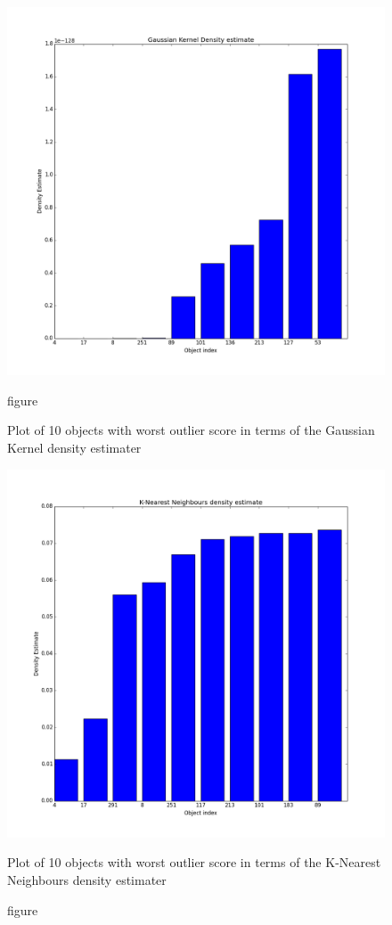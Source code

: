 \documentclass[a4paper,10pt]{article}
\begin{document}
\begin{figure}[H]
\centering
\begin{minipage}{.45\textwidth}
  \centering
  \includegraphics[width=1\linewidth]{fig_anomaly_kde_gauss}
  \caption{figure}{Plot of 10 objects with worst outlier score in terms of the Gaussian Kernel density estimater}
  \label{fig_anom_gauss}
\end{minipage}\hfill
\begin{minipage}{.45\textwidth}
  \centering
  \includegraphics[width=1\linewidth]{fig_anomaly_knn_de}
  \caption{figure}{Plot of 10 objects with worst outlier score in terms of the K-Nearest Neighbours density estimater}
  \label{fig_anom_knn}
\end{minipage}
\end{figure}
\end{document}
